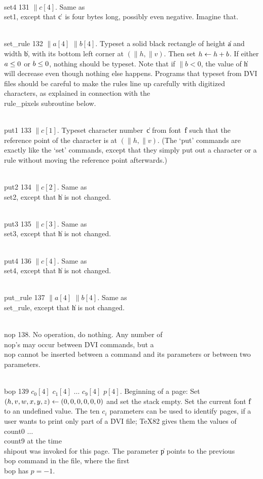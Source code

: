 \yskip\hang\\{set4} 131 $\|c[4]$. Same as \\{set1}, except that \|c~is four
bytes long, possibly even negative. Imagine that.

\yskip\hang\\{set\_rule} 132 $\|a[4]$ $\|b[4]$. Typeset a solid black rectangle
of height \|a and width \|b, with its bottom left corner at $(\|h,\|v)$. Then
set $\hbox{$h$}\gets\hbox{$h$}+\hbox{$b$}$. If either $\hbox{$a$}\le0$ or $\hbox{$b$}\le0$, nothing should be typeset.
Note
that if $\|b<0$, the value of \|h will decrease even though nothing else
happens.
Programs that typeset from \.{DVI} files should be careful to make the rules
line up carefully with digitized characters, as explained in connection with
the \\{rule\_pixels} subroutine below.

\yskip\hang\\{put1} 133 $\|c[1]$. Typeset character number~\|c from font~\|f
such that the reference point of the character is at $(\|h,\|v)$. (The `put'
commands are exactly like the `set' commands, except that they simply put out a
character or a rule without moving the reference point afterwards.)

\yskip\hang\\{put2} 134 $\|c[2]$. Same as \\{set2}, except that \|h is not
changed.

\yskip\hang\\{put3} 135 $\|c[3]$. Same as \\{set3}, except that \|h is not
changed.

\yskip\hang\\{put4} 136 $\|c[4]$. Same as \\{set4}, except that \|h is not
changed.

\yskip\hang\\{put\_rule} 137 $\|a[4]$ $\|b[4]$. Same as \\{set\_rule}, except
that
\|h is not changed.

\yskip\hang\\{nop} 138. No operation, do nothing. Any number of \\{nop}'s
may occur between \.{DVI} commands, but a \\{nop} cannot be inserted between
a command and its parameters or between two parameters.

\yskip\hang\\{bop} 139 $c_0[4]$ $c_1[4]$ $\ldots$ $c_9[4]$ $p[4]$. Beginning
of a page: Set $(\hbox{$h$},\hbox{$v$},\hbox{$w$},\hbox{$x$},\hbox{$y$},\hbox{$z$})\gets(0,0,0,0,0,0)$ and set the stack
empty. Set
the current font \|f to an undefined value.  The ten $c_i$ parameters can
be used to identify pages, if a user wants to print only part of a \.{DVI}
file; \TeX82 gives them the values of \.{\\count0} $\ldots$ \.{\\count9}
at the time \.{\\shipout} was invoked for this page.  The parameter \|p
points to the previous \\{bop} command in the file, where the first \\{bop}
has $p=-1$.

